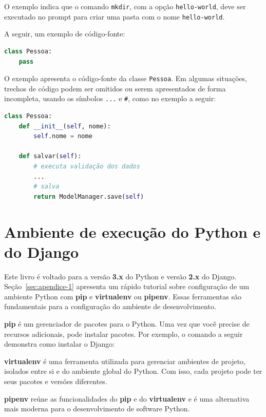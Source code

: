 \documentclass[brazil,a4paper,oneside,openright,parskip=full]{book}
\newcommand{\passthrough}[1]{#1}
\begin{document}
O exemplo indica que o comando \passthrough{\lstinline!mkdir!}, com a
opção \passthrough{\lstinline!hello-world!}, deve ser executado no
prompt para criar uma pasta com o nome
\passthrough{\lstinline!hello-world!}.

A seguir, um exemplo de código-fonte:

\begin{lstlisting}[language=Python]
class Pessoa:
    pass
\end{lstlisting}

O exemplo apresenta o código-fonte da classe
\passthrough{\lstinline!Pessoa!}. Em algumas situações, trechos de
código podem ser omitidos ou serem apresentados de forma incompleta,
usando os símbolos \passthrough{\lstinline!...!} e
\passthrough{\lstinline!#!}, como no exemplo a seguir:

\begin{lstlisting}[language=Python]
class Pessoa:
    def __init__(self, nome):
        self.nome = nome
    
    def salvar(self):
        # executa validação dos dados
        ...
        # salva 
        return ModelManager.save(self)
\end{lstlisting}

\hypertarget{ambiente-de-execuuxe7uxe3o-do-python-e-do-django}{%
\section{Ambiente de execução do Python e do
Django}\label{ambiente-de-execuuxe7uxe3o-do-python-e-do-django}}

Este livro é voltado para a versão \textbf{3.x} do Python e versão
\textbf{2.x} do Django. Seção~\ref{sec:apendice-1} apresenta um rápido
tutorial sobre configuração de um ambiente Python com \textbf{pip} e
\textbf{virtualenv} ou \textbf{pipenv}. Essas ferramentas são
fundamentais para a configuração do ambiente de desenvolvimento.

\textbf{pip} é um gerenciador de pacotes para o Python. Uma vez que você
precise de recursos adicionais, pode instalar pacotes. Por exemplo, o
comando a seguir demonstra como instalar o Django:

\textbf{virtualenv} é uma ferramenta utilizada para gerenciar ambientes
de projeto, isolados entre si e do ambiente global do Python. Com isso,
cada projeto pode ter seus pacotes e versões diferentes.

\textbf{pipenv} reúne as funcionalidades do \textbf{pip} e do
\textbf{virtualenv} e é uma alternativa mais moderna para o
desenvolvimento de software Python.
\end{document}
